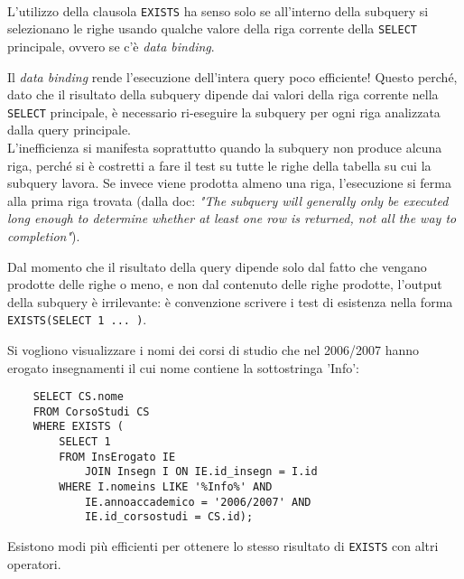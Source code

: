 \documentclass[12pt,a4paper]{book}
\begin{document}
	\paragraph{}L'utilizzo della clausola \texttt{EXISTS} ha senso solo se all'interno della subquery si selezionano le righe usando qualche valore della riga corrente della \texttt{SELECT} principale, ovvero se c'è \textit{data binding}.
	\begin{tcolorbox}[enhanced jigsaw, breakable, title=Problema: data binding, colframe=red!70!black]
		Il \textit{data binding} rende l'esecuzione dell'intera query poco efficiente! Questo perché, dato che il risultato della subquery dipende dai valori della riga corrente nella \texttt{SELECT} principale, è necessario ri-eseguire la subquery per ogni riga analizzata dalla query principale.\\L'inefficienza si manifesta soprattutto quando la subquery non produce alcuna riga, perché si è costretti a fare il test su tutte le righe della tabella su cui la subquery lavora. Se invece viene prodotta almeno una riga, l'esecuzione si ferma alla prima riga trovata (dalla doc: \textit{"The subquery will generally only be executed long enough to determine whether at least one row is returned, not all the way to completion"}).
	\end{tcolorbox}
	Dal momento che il risultato della query dipende solo dal fatto che vengano prodotte delle righe o meno, e non dal contenuto delle righe prodotte, l'output della subquery è irrilevante: è convenzione scrivere i test di esistenza nella forma \texttt{EXISTS(SELECT 1 ... )}. \\
	\begin{tcolorbox}[enhanced jigsaw, breakable,title=Esempio, title filled]
		Si vogliono visualizzare i nomi dei corsi di studio che nel 2006/2007 hanno erogato insegnamenti il cui nome contiene la sottostringa ’Info’:
	\begin{lstlisting}
	SELECT CS.nome 
	FROM CorsoStudi CS
	WHERE EXISTS (
		SELECT 1 
		FROM InsErogato IE 
			JOIN Insegn I ON IE.id_insegn = I.id
		WHERE I.nomeins LIKE '%Info%' AND 
			IE.annoaccademico = '2006/2007' AND 
			IE.id_corsostudi = CS.id);
		\end{lstlisting}
	\end{tcolorbox}
	Esistono modi più efficienti per ottenere lo stesso risultato di \texttt{EXISTS} con altri operatori.
\end{document}
